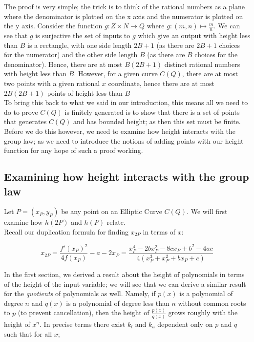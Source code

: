 \documentclass{article}
\begin{document}
The proof is very simple; the trick is to think of the rational numbers as a plane where the denominator is plotted on the x axis and the numerator is plotted on the y axis. Consider the function $g: Z \times N \rightarrow Q$ where $g: (m, n) \mapsto \frac{m}{n}$. We can see that $g$ is surjective the set of inputs to $g$ which give an output with height less than $B$ is a rectangle, with one side length $2B + 1$ (as there are $2B + 1$ choices for the numerator) and the other side length $B$ (as there are $B$ choices for the denominator). Hence, there are at most $B(2B + 1)$ distinct rational numbers with height less than $B$. However, for a given curve $C(Q)$, there are at most two points with a given rational $x$ coordinate, hence there are at most $2B(2B + 1)$ points of height less than $B$\\


To bring this back to what we said in our introduction, this means all we need to do to prove $C(Q)$ is finitely generated is to show that there is a set of points that generates $C(Q)$ and has bounded height; as then this set must be finite. Before we do this however, we need to examine how height interacts with the group law; as we need to introduce the notions of adding points with our height function for any hope of such a proof working.\\

\subsection{Examining how height interacts with the group law}

Let $P = (x_P, y_P)$ be any point on an Elliptic Curve $C(Q)$. We will first examine how $h(2P)$ and $h(P)$ relate.\\

Recall our duplication formula for finding $x_{2P}$ in terms of $x$:

\[x_{2P} = \frac{f'(x_P)^2}{4 f(x_P)} - a - 2x_P = \frac{x_P^4 - 2bx_P^2 - 8cx_P + b^2 - 4ac}{4(x_P^3 +x_P^2 + bx_P + c)}\]

In the first section, we derived a result about the height of polynomials in terms of the height of the input variable; we will see that we can derive a similar result for the \emph{quotients} of polynomials as well. Namely, if $p(x)$ is a polynomial of degree $n$ and $q(x)$ is a polynomial of degree less than $n$ without common roots to $p$ (to prevent cancellation), then the height of $\frac{p(x)}{q(x)}$ grows roughly with the height of $x^n$. In precise terms there exist $k_l$ and $k_u$ dependent only on $p$ and $q$ such that for all $x$;
\end{document}
